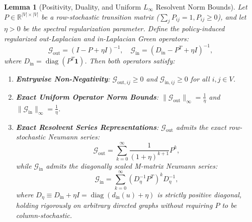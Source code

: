 \documentclass[11pt,a4paper]{article}
\newtheorem{lemma}{Lemma}
\begin{document}
\begin{lemma}[Positivity, Duality, and Uniform $L_\infty$ Resolvent Norm Bounds]
\label{lem:green_norm}
Let $P \in \mathbb{R}^{|V| \times |V|}$ be a row-stochastic transition matrix ($\sum_j P_{ij} = 1, P_{ij} \ge 0$), and let $\eta > 0$ be the spectral regularization parameter. Define the policy-induced regularized out-Laplacian and in-Laplacian Green operators:
\begin{equation}
\mathcal{G}_{\text{out}} = (I - P + \eta I)^{-1}, \quad \mathcal{G}_{\text{in}} = (D_{\text{in}} - P^T + \eta I)^{-1},
\end{equation}
where $D_{\text{in}} = \operatorname{diag}(P^T \mathbf{1})$. Then both operators satisfy:
\begin{enumerate}
    \item \textbf{Entrywise Non-Negativity}: $\mathcal{G}_{\text{out}, ij} \ge 0$ and $\mathcal{G}_{\text{in}, ij} \ge 0$ for all $i, j \in V$.
    \item \textbf{Exact Uniform Operator Norm Bounds}: $\|\mathcal{G}_{\text{out}}\|_\infty = \frac{1}{\eta}$ and $\|\mathcal{G}_{\text{in}}\|_\infty = \frac{1}{\eta}$.
    \item \textbf{Exact Resolvent Series Representations}: $\mathcal{G}_{\text{out}}$ admits the exact row-stochastic Neumann series:
    \begin{equation}
    \label{eq:g_out_neumann}
    \mathcal{G}_{\text{out}} = \sum_{k=0}^\infty \frac{1}{(1 + \eta)^{k+1}} P^k,
    \end{equation}
    while $\mathcal{G}_{\text{in}}$ admits the diagonally scaled M-matrix Neumann series:
    \begin{equation}
    \label{eq:g_in_neumann}
    \mathcal{G}_{\text{in}} = \sum_{k=0}^\infty (D_\eta^{-1} P^T)^k D_\eta^{-1},
    \end{equation}
    where $D_\eta \equiv D_{\text{in}} + \eta I = \operatorname{diag}(d_{\text{in}}(u) + \eta)$ is strictly positive diagonal, holding rigorously on arbitrary directed graphs without requiring $P$ to be column-stochastic.
\end{enumerate}
\end{lemma}
\end{document}
